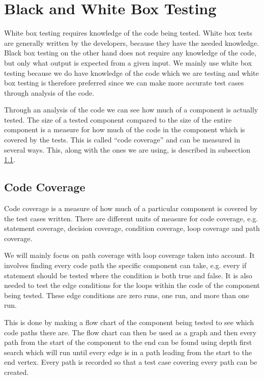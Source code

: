 \section{Black and White Box Testing}
\label{chap:whiteBox}
White box testing requires knowledge of the code being tested.
White box tests are generally written by the developers, because they have the needed knowledge.
Black box testing on the other hand does not require any knowledge of the code, but only what output is expected from a given input.
We mainly use white box testing because we do have knowledge of the code which we are testing and white box testing is therefore preferred since we can make more accurate test cases through analysis of the code.

Through an analysis of the code we can see how much of a component is actually tested.
The size of a tested component compared to the size of the entire component is a measure for how much of the code in the component which is covered by the tests.
This is called ``code coverage'' and can be measured in several ways.
This, along with the ones we are using, is described in subsection \ref{sub:codeCoverage}.

\subsection{Code Coverage}
\label{sub:codeCoverage}
Code coverage is a measure of how much of a particular component is covered by the test cases written. \cite{cornett10}
There are different units of measure for code coverage, e.g. statement coverage, decision coverage, condition coverage, loop coverage and path coverage.

We will mainly focus on path coverage with loop coverage taken into account.
It involves finding every code path the specific component can take, e.g. every if statement should be tested where the condition is both true and false.
It is also needed to test the edge conditions for the loops within the code of the component being tested.
These edge conditions are zero runs, one run, and more than one run.

This is done by making a flow chart of the component being tested to see which code paths there are.
The flow chart can then be used as a graph and then every path from the start of the component to the end can be found using depth first search which will run until every edge is in a path leading from the start to the end vertex.
Every path is recorded so that a test case covering every path can be created. \cite{whiteBox}




\begin{comment}
\subsection{Our Use of White Box Testing}
We have used white box testing to test our tool component and the parts of the model component which we have wrote our selves -- the ADO.NET was used to generate much of the needed model.
In order to insure that the code of the parts we were testing was covered we created a flow chart of the most complicated parts.
\end{comment}